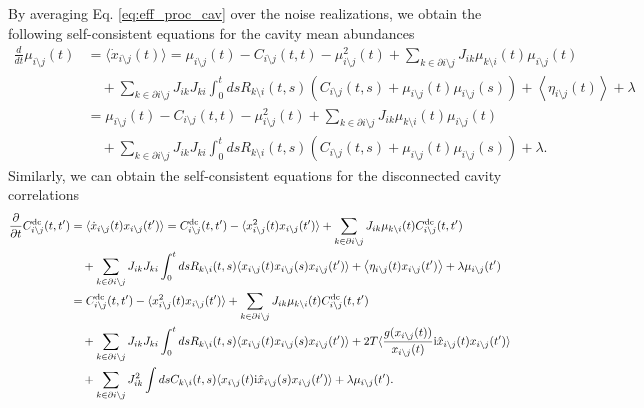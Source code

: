 \documentclass[
    preprint,
    linenumbers,
    amsmath,amssymb,amsfonts,
    aps, physrev,
    superscriptaddress,
    10pt,
    bibnotes
    ]{revtex4-2}
\begin{document}
By averaging Eq. \eqref{eq:eff_proc_cav} over the noise realizations, we obtain the following self-consistent equations for the cavity mean abundances
\begin{subequations}
  \begin{align}
    \frac{d}{dt}\mu_{i\setminus j}(t) & =  \langle \dot{x}_{i\setminus j}(t) \rangle = \mu_{i\setminus j}(t)-C_{i\setminus j}(t,t)-\mu_{i\setminus j}^2(t)+\sum_{k\in\partial i \setminus j}J_{ik}\mu_{k\setminus i}(t)\mu_{i\setminus j}(t)  \nonumber \\
    &\quad +\sum_{k\in \partial i \setminus j}J_{ik}J_{ki}\int_{0}^{t}ds R_{k\setminus i}(t, s)\left(C_{i\setminus j}(t, s)+\mu_{i\setminus j}(t)\mu_{i\setminus j}(s)\right)+ \left\langle \eta_{i\setminus j}(t)\right\rangle + \lambda\\
    & = \mu_{i\setminus j}(t)-C_{i\setminus j}(t,t)-\mu_{i\setminus j}^2(t)+\sum_{k\in\partial i \setminus j}J_{ik}\mu_{k\setminus i}(t)\mu_{i\setminus j}(t)  \nonumber \\
    &\quad +\sum_{k\in \partial i \setminus j}J_{ik}J_{ki}\int_{0}^{t}ds R_{k\setminus i}(t, s)\left(C_{i\setminus j}(t, s)+\mu_{i\setminus j}(t)\mu_{i\setminus j}(s)\right) + \lambda.
  \end{align}
\end{subequations}
Similarly, we can obtain the self-consistent equations for the disconnected cavity correlations
\begin{subequations}
  \begin{align}
    \frac{\partial}{\partial t}C^{\rm dc}_{i\setminus j}(t,t') & = \langle \dot{x}_{i\setminus j}(t) x_{i\setminus j}(t') \rangle = C^{\rm dc}_{i\setminus j}(t,t') - \langle x_{i\setminus j}^2(t)x_{i\setminus j}(t') \rangle + \sum_{k\in\partial i \setminus j}J_{ik}\mu_{k\setminus i}(t)C^{\rm dc}_{i\setminus j}(t,t') \nonumber\\
    &\quad + \sum_{k\in \partial i \setminus j}J_{ik}J_{ki}\int_0^t ds R_{k\setminus i}(t,s)\langle x_{i\setminus j}(t)x_{i\setminus j}(s)x_{i\setminus j}(t')\rangle + \left \langle \eta_{i\setminus j}(t)x_{i\setminus j}(t')\right \rangle + \lambda \mu_{i\setminus j}( t')\\
    & = C^{\rm dc}_{i\setminus j}(t,t') - \langle x_{i\setminus j}^2(t)x_{i\setminus j}(t') \rangle + \sum_{k\in\partial i \setminus j}J_{ik}\mu_{k\setminus i}(t)C^{\rm dc}_{i\setminus j}(t,t') \nonumber\\
    &\quad + \sum_{k\in \partial i \setminus j}J_{ik}J_{ki}\int_0^t ds R_{k\setminus i}(t,s)\langle x_{i\setminus j}(t)x_{i\setminus j}(s)x_{i\setminus j}(t')\rangle + 2T \langle \frac{g(x_{i\setminus j}(t))}{x_{i\setminus j}(t)}{\rm i}\hat{x}_{i\setminus j}(t)x_{i\setminus j}(t') \rangle \nonumber \\
    &\quad + \sum_{k\in \partial i \setminus j} J_{ik}^2 \int ds C_{k\setminus i}(t,s) \langle x_{i \setminus j}(t) {\rm i} \hat{x}_{i \setminus j}(s) x_{i \setminus j}(t') \rangle + \lambda \mu_{i\setminus j}( t').
  \end{align}
\end{subequations}
\end{document}

